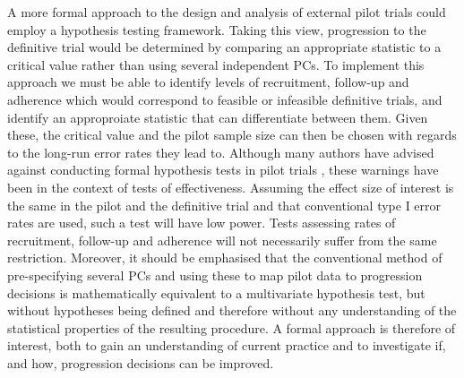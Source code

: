\documentclass{article}
\begin{document}

A more formal approach to the design and analysis of external pilot trials could employ a hypothesis testing framework. Taking this view, progression to the definitive trial would be determined by comparing an appropriate statistic to a critical value rather than using several independent PCs. To implement this approach we must be able to  identify levels of recruitment, follow-up and adherence which would correspond to feasible or infeasible definitive trials, and identify an approproiate statistic that can differentiate between them. Given these, the critical value and the pilot sample size can then be chosen with regards to the long-run error rates they lead to. %
Although many authors have advised against conducting formal hypothesis tests in pilot trials \cite{Lancaster2004, Arain2010, Thabane2010, Eldridge2015}, these warnings have been in the context of tests of effectiveness. Assuming the effect size of interest is the same in the pilot and the definitive trial and that conventional type I error rates are used, such a test will have low power. Tests assessing rates of recruitment, follow-up and adherence will not necessarily suffer from the same restriction. Moreover, it should be emphasised that the conventional method of pre-specifying several PCs and using these to map pilot data to progression decisions is mathematically equivalent to a multivariate hypothesis test, but without hypotheses being defined and therefore without any understanding of the statistical properties of the resulting procedure. A formal approach is therefore of interest, both to gain an understanding of current practice and to investigate if, and how, progression decisions can be improved. %
\end{document}
